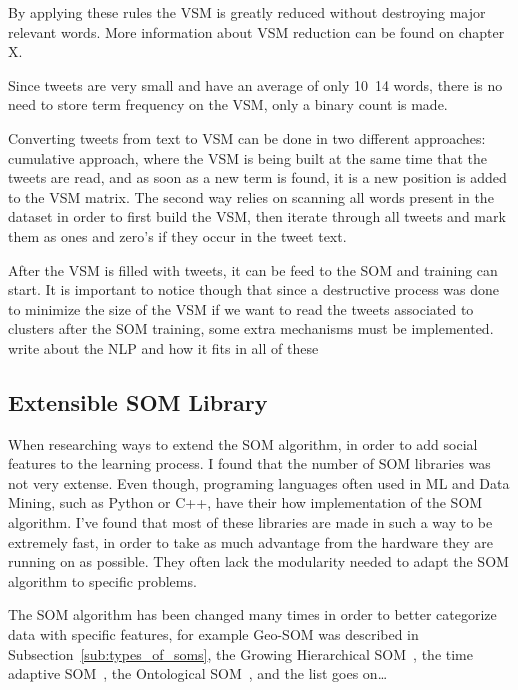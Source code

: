 By applying these rules the \ac{VSM} is greatly reduced without destroying major relevant words. More information about \ac{VSM} reduction can be found on chapter X.

Since tweets are very small and have an average of only 10~14 words, there is no need to store term frequency on the \ac{VSM}, only a binary count is made.

Converting tweets from text to \ac{VSM} can be done in two different approaches: cumulative approach, where the \ac{VSM} is being built at the same time that the tweets are read, and as soon as a new term is found, it is a new position is added to the \ac{VSM} matrix. The second way relies on scanning all words present in the dataset in order to first build the \ac{VSM}, then iterate through all tweets and mark them as ones and zero's if they occur in the tweet text. 

After the \ac{VSM} is filled with tweets, it can be feed to the \ac{SOM} and training can start. It is important to notice though that since a destructive process was done to minimize the size of the \ac{VSM} if we want to read the tweets associated to clusters after the \ac{SOM} training, some extra mechanisms must be implemented.
{\color{red} write about the NLP and how it fits in all of these }
\subsection{Extensible SOM Library}
\label{sub:extensible_som_library}

When researching ways to extend the \ac{SOM} algorithm, in order to add social features to the learning process. I found that the number of \ac{SOM} libraries was not very extense. Even though, programing languages often used in \ac{ML} and Data Mining, such as Python or C++, have their how implementation of the \ac{SOM} algorithm. I've found that most of these libraries are made in such a way to be extremely fast, in order to take as much advantage from the hardware they are running on as possible. They often lack the modularity needed to adapt the \ac{SOM} algorithm to specific problems.

The \ac{SOM} algorithm has been changed many times in order to better categorize data with specific features, for example Geo-\ac{SOM} was described in Subsection~\ref{sub:types_of_soms}, the Growing Hierarchical \ac{SOM}~\cite[]{1058070}, the time adaptive \ac{SOM}~\cite[]{1187438}, the Ontological \ac{SOM}~\cite[]{5446427}, and the list goes on\dots  

